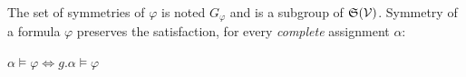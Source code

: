 The set of symmetries of $\varphi$ is noted $G_{\varphi}$ and is a subgroup of $\mathfrak{S}(\mathcal{V})$.
Symmetry of a formula $\varphi$ preserves the satisfaction, for every \emph{complete} assignment $\alpha$:
\begin{center}
 $\alpha \models \varphi\Leftrightarrow g.\alpha \models \varphi$
\end{center}
% 


%
%
%

